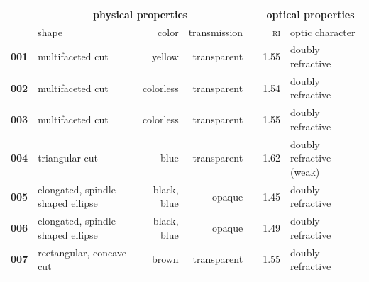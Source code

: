 \documentclass[10pt]{article}
\theoremstyle{definition}
\begin{document}
\begin{table}\footnotesize
\centering
{\renewcommand{\arraystretch}{1.2}
\begin{tabular}{lp{5em}rrrrp{7.5em}}
\hline
                                   & \multicolumn{3}{c}{\textbf{physical properties}}                                                                                                                  & & \multicolumn{2}{c}{\textbf{optical properties}}                                                                                      \\ \cline{2-4} \cline{6-7}
 & shape & color & transmission & & \textsc{ri} & optic character \\ \hline
\textbf{001}                                & multifaceted cut                   & yellow                                     & transparent                               &  & 1.55                                          & doubly refractive                            \\
\textbf{002}                                & multifaceted cut                   & colorless                                  & transparent                               &  & 1.54                                          & doubly refractive                            \\
\textbf{003}                                & multifaceted cut                   & colorless                                  & transparent                               &  & 1.55                                          & doubly refractive                            \\
\textbf{004}                                & triangular cut                     & blue                                       & transparent                               &  & 1.62                                          & doubly refractive (weak)                     \\
\textbf{005}                                & elongated, spindle-shaped ellipse  & black, blue                                      & opaque                                    &  & 1.45                                          & doubly refractive                            \\
\textbf{006}                                & elongated, spindle-shaped ellipse  & black, blue                                      & opaque                                    &  & 1.49                                          & doubly refractive                            \\
\textbf{007}                                & rectangular, concave cut           & brown                                      & transparent                               &  & 1.55                                          & doubly refractive                            \\

\end{tabular}}
\end{table}
\end{document}
